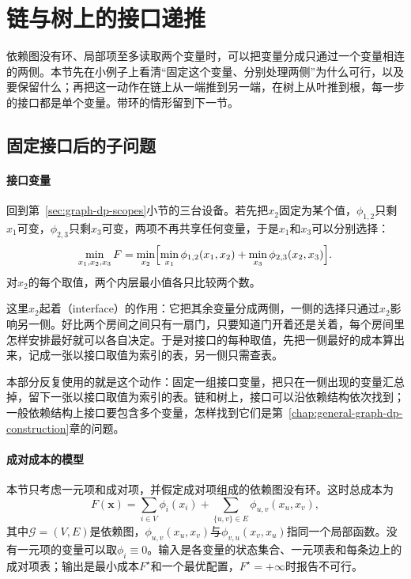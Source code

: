 
\section{链与树上的接口递推}
\label{sec:graph-tree-dp}

依赖图没有环、局部项至多读取两个变量时，可以把变量分成只通过一个变量相连的两侧。本节先在小例子上看清“固定这个变量、分别处理两侧”为什么可行，以及要保留什么；再把这一动作在链上从一端推到另一端，在树上从叶推到根，每一步的接口都是单个变量。带环的情形留到下一节。

\subsection{固定接口后的子问题}
\label{sec:graph-dp-tree-idea}

\paragraph{接口变量}
回到第~\ref{sec:graph-dp-scopes}小节的三台设备。若先把$x_2$固定为某个值，$\phi_{1,2}$只剩$x_1$可变，$\phi_{2,3}$只剩$x_3$可变，两项不再共享任何变量，于是$x_1$和$x_3$可以分别选择：
\[
\min_{x_1,x_2,x_3}F=\min_{x_2}\Bigl[\min_{x_1}\phi_{1,2}(x_1,x_2)+\min_{x_3}\phi_{2,3}(x_2,x_3)\Bigr].
\]
对$x_2$的每个取值，两个内层最小值各只比较两个数。

这里$x_2$起着（interface）的作用：它把其余变量分成两侧，一侧的选择只通过$x_2$影响另一侧。好比两个房间之间只有一扇门，只要知道门开着还是关着，每个房间里怎样安排最好就可以各自决定。于是对接口的每种取值，先把一侧最好的成本算出来，记成一张以接口取值为索引的表，另一侧只需查表。

本部分反复使用的就是这个动作：固定一组接口变量，把只在一侧出现的变量汇总掉，留下一张以接口取值为索引的表。链和树上，接口可以沿依赖结构依次找到；一般依赖结构上接口要包含多个变量，怎样找到它们是第~\ref{chap:general-graph-dp-construction}章的问题。

\paragraph{成对成本的模型}
本节只考虑一元项和成对项，并假定成对项组成的依赖图没有环。这时总成本为
\begin{equation}
F(\bm x)=\sum_{i\in V}\phi_i(x_i)+\sum_{\{u,v\}\in E}\phi_{u,v}(x_u,x_v),
\label{eq:graph-dp-pairwise-cost}
\end{equation}
其中$\mathcal G=(V,E)$是依赖图，$\phi_{u,v}(x_u,x_v)$与$\phi_{v,u}(x_v,x_u)$指同一个局部函数。没有一元项的变量可以取$\phi_i\equiv0$。输入是各变量的状态集合、一元项表和每条边上的成对项表；输出是最小成本$F^\star$和一个最优配置，$F^\star=+\infty$时报告不可行。

